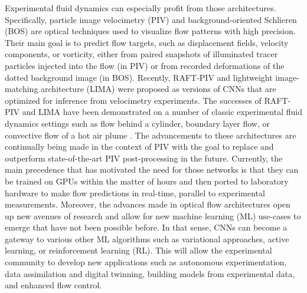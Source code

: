 \documentclass[a4paper,fleqn]{cas-dc}
\begin{document}
Experimental fluid dynamics can especially profit from those architectures. Specifically, particle image velocimetry (PIV) and background-oriented Schlieren (BOS) are optical techniques used to visualize flow patterns with high precision. Their main goal is to predict flow targets, such as displacement fields, velocity components, or vorticity, either from paired snapshots of illuminated tracer particles injected into the flow (in PIV) or from recorded deformations of the dotted background image (in BOS). Recently, RAFT-PIV \cite{lagemann2021deep} and lightweight image-matching architecture (LIMA) \citep{manickathan2023lightweight} were proposed as versions of CNNs that are optimized for inference from velocimetry experiments. The successes of RAFT-PIV and LIMA have been demonstrated on a number of classic experimental fluid dynamics settings such as flow behind a cylinder, boundary layer flow, or convective flow of a hot air plume \cite{mucignat2023lightweight}. The advancements to these architectures are continually being made in the context of PIV \citep{yu2021lightpivnet, fan2023deep, choi2023deep, shan2024lightweight, elrefaie2024site} with the goal to replace and outperform state-of-the-art PIV post-processing in the future. Currently, the main precedence that has motivated the need for those networks is that they can be trained on GPUs within the matter of hours and then ported to laboratory hardware to make flow predictions in real-time, parallel to experimental measurements.
Moreover, the advances made in optical flow architectures open up new avenues of research and allow for new machine learning (ML) use-cases to emerge that have not been possible before. In that sense, CNNs can become a gateway to various other ML algorithms such as variational approaches, active learning, or reinforcement learning (RL). This will allow the experimental community to develop new applications such as autonomous experimentation, data assimilation and digital twinning, building models from experimental data, and enhanced flow control.
\end{document}
